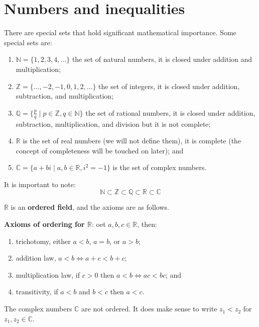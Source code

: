 \chapter{Numbers and inequalities}

\begin{definition}
    There are special sets that hold significant mathematical importance. Some special sets are:
    \begin{enumerate}
        \item $\mathbb N=\{1,2,3,4,\ldots\}$ the set of natural numbers, it is closed under addition and multiplication;
        \item $\mathbb Z=\{\ldots,-2,-1,0,1,2,\ldots\}$ the set of integers, it is closed under addition, subtraction, and multiplication;
        \item $\mathbb Q=\{\frac pq\mid p\in\mathbb Z,q\in\mathbb N\}$ the set of rational numbers, it is closed under addition, subtraction, multiplication, and division but it is not complete; 
        \item $\mathbb R$ is the set of real numbers (we will not define them), it is complete (the concept of completeness will be touched on later); and
        \item $\mathbb C=\{a+bi\mid a,b\in\mathbb R,i^2=-1\}$ is the set of complex numbers.
    \end{enumerate}
    It is important to note:
    \[\mathbb N\subset\mathbb Z\subset\mathbb Q\subset\mathbb R\subset\mathbb C\]
\end{definition}

$\mathbb R$ is an \textbf{ordered field}, and the axioms are as follows.

\begin{proposition}
    \textbf{Axioms of ordering for $\mathbb R$}:
    oet $a,b,c\in\mathbb R$, then:
    \begin{enumerate}
        \item trichotomy, either $a<b$, $a=b$, or $a>b$;
        \item addition law, $a<b\iff a+c<b+c$;
        \item multiplication law, if $c>0$ then  $a<b\iff ac<bc$; and
        \item transitivity, if $a<b$ and $b<c$ then $a<c$.
    \end{enumerate}
\end{proposition}

\begin{remark}
    The complex numbers $\mathbb C$ are not ordered. It does make sense to write $z_1<z_2$ for $z_1,z_2\in\mathbb C$.
\end{remark}


